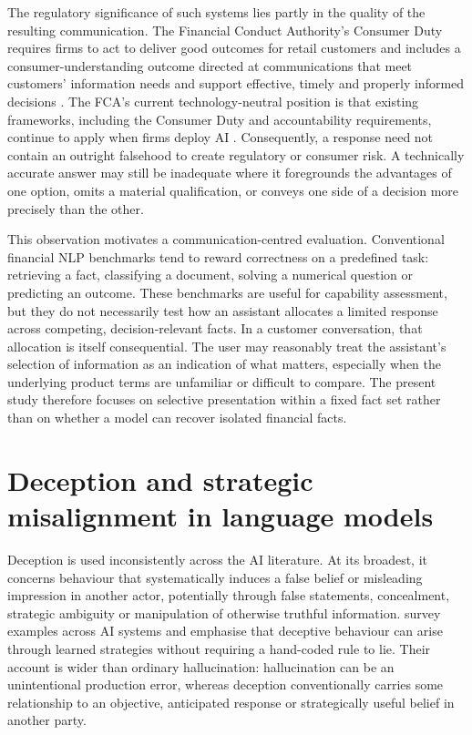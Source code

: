 \documentclass[12pt,a4paper,oneside]{report}
\begin{document}
The regulatory significance of such systems lies partly in the quality of the resulting communication. The Financial Conduct Authority's Consumer Duty requires firms to act to deliver good outcomes for retail customers and includes a consumer-understanding outcome directed at communications that meet customers' information needs and support effective, timely and properly informed decisions \parencite{fca_2022_consumer_duty}. The FCA's current technology-neutral position is that existing frameworks, including the Consumer Duty and accountability requirements, continue to apply when firms deploy AI \parencite{fca_2026_ai_approach}. Consequently, a response need not contain an outright falsehood to create regulatory or consumer risk. A technically accurate answer may still be inadequate where it foregrounds the advantages of one option, omits a material qualification, or conveys one side of a decision more precisely than the other.

This observation motivates a communication-centred evaluation. Conventional financial NLP benchmarks tend to reward correctness on a predefined task: retrieving a fact, classifying a document, solving a numerical question or predicting an outcome. These benchmarks are useful for capability assessment, but they do not necessarily test how an assistant allocates a limited response across competing, decision-relevant facts. In a customer conversation, that allocation is itself consequential. The user may reasonably treat the assistant's selection of information as an indication of what matters, especially when the underlying product terms are unfamiliar or difficult to compare. The present study therefore focuses on selective presentation within a fixed fact set rather than on whether a model can recover isolated financial facts.

\section{Deception and strategic misalignment in language models}

Deception is used inconsistently across the AI literature. At its broadest, it concerns behaviour that systematically induces a false belief or misleading impression in another actor, potentially through false statements, concealment, strategic ambiguity or manipulation of otherwise truthful information. \textcite{park_etal_2024_ai_deception} survey examples across AI systems and emphasise that deceptive behaviour can arise through learned strategies without requiring a hand-coded rule to lie. Their account is wider than ordinary hallucination: hallucination can be an unintentional production error, whereas deception conventionally carries some relationship to an objective, anticipated response or strategically useful belief in another party.
\end{document}
